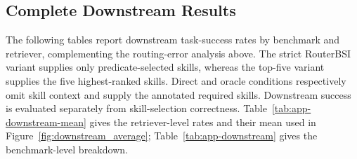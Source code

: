 \subsection{Complete Downstream Results}
The following tables report downstream task-success rates by benchmark and retriever, complementing the routing-error analysis above. The strict RouterBSI variant supplies only predicate-selected skills, whereas the top-five variant supplies the five highest-ranked skills. Direct and oracle conditions respectively omit skill context and supply the annotated required skills. Downstream success is evaluated separately from skill-selection correctness.
Table~\ref{tab:app-downstream-mean} gives the retriever-level rates and their mean used in Figure~\ref{fig:downstream_average}; Table~\ref{tab:app-downstream} gives the benchmark-level breakdown.


